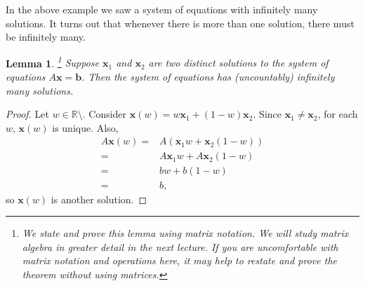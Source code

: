 \documentclass[12pt,reqno]{amsart}
\newtheorem{lemma}{Lemma}[section]
\theoremstyle{definition}
\begin{document}
In the above example we saw a system of equations with infinitely many
solutions. It turns out that whenever there is more than one solution,
there must be infinitely many.
\begin{lemma}\label{lem:sinf}
  \footnote{We state and prove this lemma using matrix notation. We
    will study matrix algebra in greater detail in the next
    lecture. If you are uncomfortable with matrix notation and
    operations here, it may help to restate and prove the theorem
    without using matrices.}  
  Suppose $\mathbf{x}_1$ and $\mathbf{x}_2$ are two distinct solutions
  to the system of equations $A \mathbf{x} = \mathbf{b}$. Then the
  system of equations has (uncountably) infinitely many solutions.
\end{lemma}
\begin{proof}
  Let $w \in \mathbb{R} \setminus$. Consider $\mathbf{x}(w) = w
  \mathbf{x}_1 + (1 - w)\mathbf{x}_2$. Since $\mathbf{x}_1 \neq
  \mathbf{x}_2$, for each $w$, $\mathbf{x}(w)$ is unique. Also,
  \begin{align*}
    A \mathbf{x}(w) = & A \left( \mathbf{x}_1 w + \mathbf{x}_2 (1-w)
    \right) \\
    = & A \mathbf{x}_1 w + A \mathbf{x}_2 (1-w) \\
    = & b w + b (1- w) \\
    = & b,
  \end{align*}
  so $\mathbf{x}(w)$ is another solution. 
\end{proof}
\end{document}
